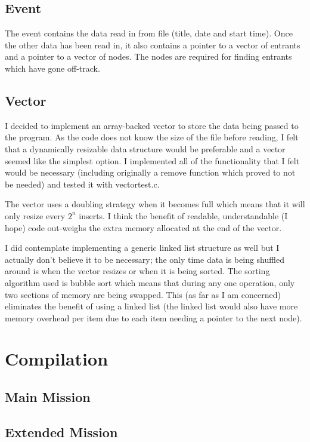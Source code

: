 \documentclass[a4paper, twoside]{article}
\begin{document}
\subsection{Event}
The event contains the data read in from file (title, date and start time).
Once the other data has been read in, it also contains a pointer to a vector
of entrants and a pointer to a vector of nodes. The nodes are required for
finding entrants which have gone off-track.

\subsection{Vector}
I decided to implement an array-backed vector to store the data being passed to
the program. As the code does not know the size of the file before reading, I
felt that a dynamically resizable data structure would be preferable and a
vector seemed like the simplest option. I implemented all of the functionality
that I felt would be necessary (including originally a remove function which
proved to not be needed) and tested it with vectortest.c.

The vector uses a doubling strategy when it becomes full which means that it
will only resize every $2^n$ inserts. I think the benefit of readable,
understandable (I hope) code out-weighs the extra memory allocated at the
end of the vector.

I did contemplate implementing a generic linked list structure as well but I
actually don't believe it to be necessary; the only time data is being shuffled
around is when the vector resizes or when it is being sorted. The sorting
algorithm used is bubble sort which means that during any one operation, only
two sections of memory are being swapped. This (as far as I am concerned)
eliminates the benefit of using a linked list (the linked list would also have
more memory overhead per item due to each item needing a pointer to the next
node).

\newpage
\section{Compilation}
\subsection{Main Mission}

\subsection{Extended Mission}

\end{document}
